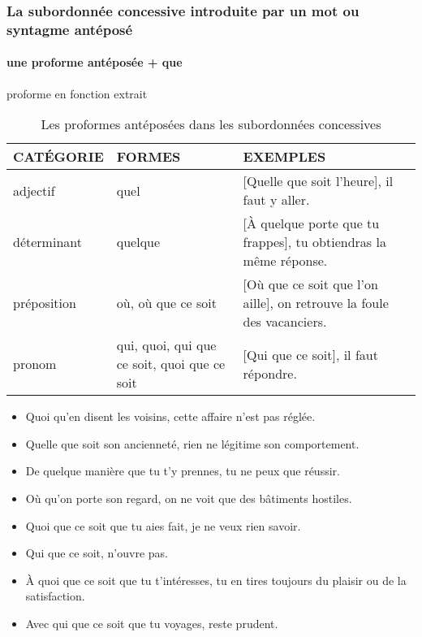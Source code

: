 \documentclass[UTF8]{report}
\begin{document}
\subsubsection{La subordonnée concessive introduite par un mot ou syntagme antéposé}
\paragraph{une proforme antéposée + que}
proforme en fonction extrait

\begin{table}[H]
    \centering
    \small
    \begin{tabular}{|p{3cm}|p{6cm}|p{6cm}|}
    \hline
    \rowcolor{cyan!20}
    \textbf{CATÉGORIE} & \textbf{FORMES} & \textbf{EXEMPLES} \\
    \hline
    adjectif & quel & [Quelle que soit l'heure], il faut y aller. \\
    \hline
    déterminant & quelque & [À quelque porte que tu frappes], tu obtiendras la même réponse. \\
    \hline
    préposition & où, où que ce soit & [Où que ce soit que l'on aille], on retrouve la foule des vacanciers. \\
    \hline
    pronom & qui, quoi, qui que ce soit, quoi que ce soit & [Qui que ce soit], il faut répondre. \\
    \hline
    \end{tabular}
    \caption{Les proformes antéposées dans les subordonnées concessives}
\end{table}
\begin{itemize}
    \item Quoi qu’en disent les voisins, cette affaire n’est pas réglée.
    \item Quelle que soit son ancienneté, rien ne légitime son comportement.
    \item De quelque manière que tu t’y prennes, tu ne peux que réussir.
    \item Où qu’on porte son regard, on ne voit que des bâtiments hostiles.
    \item Quoi que ce soit que tu aies fait, je ne veux rien savoir.
    \item Qui que ce soit, n’ouvre pas.
    \item À quoi que ce soit que tu t’intéresses, tu en tires toujours du plaisir ou de la satisfaction.
    \item Avec qui que ce soit que tu voyages, reste prudent.
\end{itemize}
\end{document}
